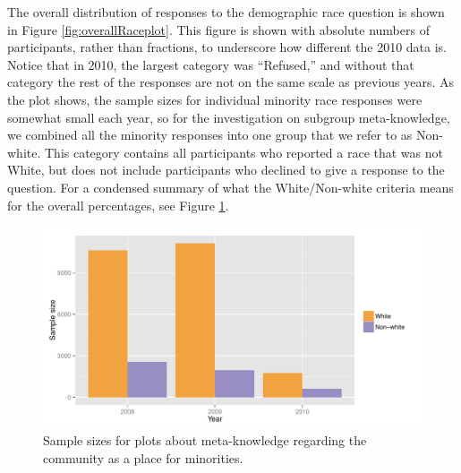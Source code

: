 \documentclass[smallextended]{svjour3}\usepackage[]{graphicx}\usepackage[]{color}
\newenvironment{knitrout}{}{} %
\begin{document}
The overall distribution of responses to the demographic race question is shown in Figure \ref{fig:overallRaceplot}. This figure is shown with absolute numbers of participants, rather than fractions, to underscore how different the 2010 data is. Notice that in 2010, the largest category was ``Refused,'' and without that category the rest of the responses are not on the same scale as previous years. As the plot shows, the sample sizes for individual minority race responses were somewhat small each year, so for the investigation on subgroup meta-knowledge, we combined all the minority responses into one group that we refer to as Non-white. This category contains all participants who reported a race that was not White, but does not include participants who declined to give a response to the question. For a condensed summary of what the White/Non-white criteria means for the overall percentages, see Figure \ref{fig:samplesize}. 



\begin{knitrout}
\color{fgcolor}\begin{figure}

{\centering \includegraphics[width=0.99\linewidth]{figure/samplesize-1} 

}

\caption[Sample sizes for plots about meta-knowledge regarding the community as a place for minorities]{Sample sizes for plots about meta-knowledge regarding the community as a place for minorities.}\label{fig:samplesize}
\end{figure}


\end{knitrout}
\end{document}
